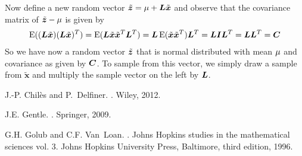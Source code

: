 \documentclass[11pt,a4paper]{amsart}
\newcommand{\xVec}{\ensuremath{\tilde{\boldsymbol{x}}}}
\begin{document}
Now define a new random vector $\randVecz = \mean+\cholMatrix \xVec$ and observe
that the covariance 
matrix of $\tilde{\boldsymbol{z}} - \mu$ is given by
\begin{multline}
  \label{eq:5}
  \expectedValue((\cholMatrix \xVec)(\cholMatrix \xVec)^T) =
  \expectedValue(\cholMatrix \xVec\xVec^T\cholMatrix^T) =
  \cholMatrix\expectedValue(\xVec\xVec^T)\cholMatrix^T = 
  \cholMatrix \identityMatrix \cholMatrix^T = 
  \cholMatrix \cholMatrix^T = \covMatrix 
\end{multline}
So we have now a random vector $\tilde{\boldsymbol{z}}$ that is normal distributed with
mean $\mu$ and covariance as given by $\boldsymbol{C}$. To sample from this vector,
we simply draw a sample from $\xVec$ and multiply the sample vector on the
left by $\boldsymbol{L}$.



\begin{thebibliography}{1}

J.-P. Chil{\`{e}}s and P.~Delfiner.
.
\newblock Wiley, 2012.

J.E. Gentle.
.
\newblock Springer, 2009.

G.H. Golub and C.F. Van~Loan.
.
\newblock Johns Hopkins studies in the mathematical sciences vol. 3. Johns
  Hopkins University Press, Baltimore, third edition, 1996.

\end{thebibliography}
\end{document}
